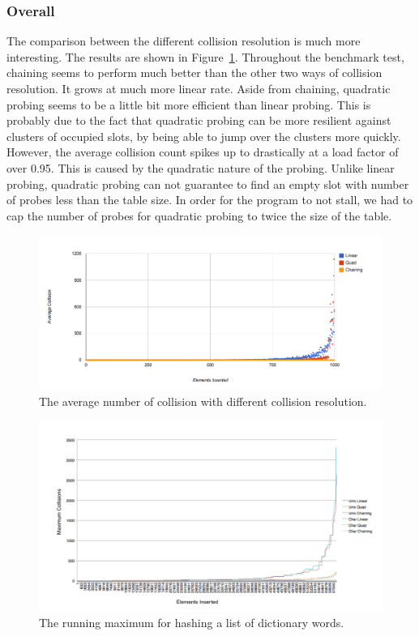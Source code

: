 \documentclass[11pt]{article}
\begin{document}
\subsubsection{Overall}
The comparison between the different collision resolution is much more interesting.
The results are shown in Figure~\ref{fig:collision}.
Throughout the benchmark test, chaining seems to perform much better than the other
two ways of collision resolution. It grows at much more linear rate. 
Aside from chaining, quadratic probing seems to be a little bit more 
efficient than linear probing. This is probably due to the fact that quadratic probing 
can be more resilient against clusters of occupied slots, by being able to jump over
the clusters more quickly. However, the average collision count spikes up to drastically
at a load factor of over 0.95. This is caused by the quadratic nature of the probing. Unlike linear
probing, quadratic probing can not guarantee to find an empty slot with number of probes
less than the table size. In order for the program to not stall, we had to cap the number of probes for quadratic probing to twice the size of the table.

\begin{figure}
        
                \centering
                \includegraphics[width=\textwidth]{collision-all.png}
              \caption{The average number of collision with different collision resolution.}
              \label{fig:collision}
\end{figure}


\begin{figure}
                \centering
                \includegraphics[width= 1.2\textwidth]{string-max-query.png}
              \caption{The running maximum for hashing a list of dictionary words.}
              \label{fig:string-max-query}
\end{figure}
\end{document}
